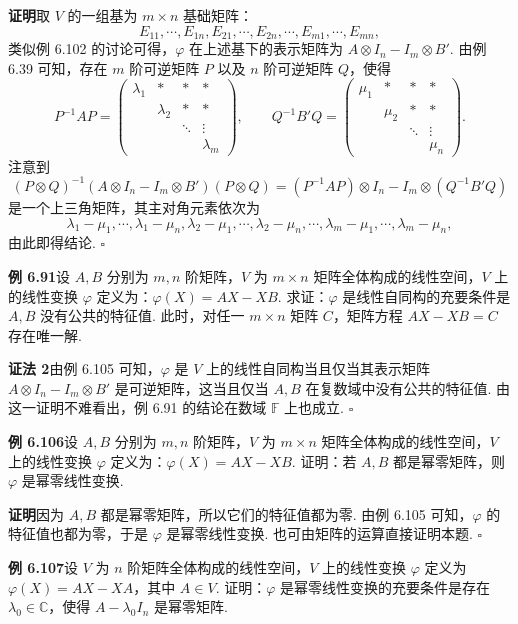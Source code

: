 \documentclass[UTF8,12pt,a4paper,fontset=fandol]{ctexart}
\begin{document}
\noindent\textbf{证明}\quad 取 $V$ 的一组基为 $m\times n$ 基础矩阵：
\[
E_{11},\cdots,E_{1n},E_{21},\cdots,E_{2n},\cdots,E_{m1},\cdots,E_{mn},
\]
类似例 6.102 的讨论可得，$\varphi$ 在上述基下的表示矩阵为 $A\otimes I_n-I_m\otimes B'$. 由例 6.39 可知，存在 $m$ 阶可逆矩阵 $P$ 以及 $n$ 阶可逆矩阵 $Q$，使得
\[
P^{-1}AP=
\begin{pmatrix}
\lambda_1&*&*&*\\
&\lambda_2&*&*\\
&&\ddots&\vdots\\
&&&\lambda_m
\end{pmatrix},\qquad
Q^{-1}B'Q=
\begin{pmatrix}
\mu_1&*&*&*\\
&\mu_2&*&*\\
&&\ddots&\vdots\\
&&&\mu_n
\end{pmatrix}.
\]
注意到
\[
(P\otimes Q)^{-1}(A\otimes I_n-I_m\otimes B')(P\otimes Q)=(P^{-1}AP)\otimes I_n-I_m\otimes(Q^{-1}B'Q)
\]
是一个上三角矩阵，其主对角元素依次为
\[
\lambda_1-\mu_1,\cdots,\lambda_1-\mu_n,\lambda_2-\mu_1,\cdots,\lambda_2-\mu_n,\cdots,\lambda_m-\mu_1,\cdots,\lambda_m-\mu_n,
\]
由此即得结论. $\square$

\noindent\textbf{例 6.91}\quad 设 $A,B$ 分别为 $m,n$ 阶矩阵，$V$ 为 $m\times n$ 矩阵全体构成的线性空间，$V$ 上的线性变换 $\varphi$ 定义为：$\varphi(X)=AX-XB$. 求证：$\varphi$ 是线性自同构的充要条件是 $A,B$ 没有公共的特征值. 此时，对任一 $m\times n$ 矩阵 $C$，矩阵方程 $AX-XB=C$ 存在唯一解.

\noindent\textbf{证法 2}\quad 由例 6.105 可知，$\varphi$ 是 $V$ 上的线性自同构当且仅当其表示矩阵 $A\otimes I_n-I_m\otimes B'$ 是可逆矩阵，这当且仅当 $A,B$ 在复数域中没有公共的特征值. 由这一证明不难看出，例 6.91 的结论在数域 $\mathbb{F}$ 上也成立. $\square$

\noindent\textbf{例 6.106}\quad 设 $A,B$ 分别为 $m,n$ 阶矩阵，$V$ 为 $m\times n$ 矩阵全体构成的线性空间，$V$ 上的线性变换 $\varphi$ 定义为：$\varphi(X)=AX-XB$. 证明：若 $A,B$ 都是幂零矩阵，则 $\varphi$ 是幂零线性变换.

\noindent\textbf{证明}\quad 因为 $A,B$ 都是幂零矩阵，所以它们的特征值都为零. 由例 6.105 可知，$\varphi$ 的特征值也都为零，于是 $\varphi$ 是幂零线性变换. 也可由矩阵的运算直接证明本题. $\square$

\noindent\textbf{例 6.107}\quad 设 $V$ 为 $n$ 阶矩阵全体构成的线性空间，$V$ 上的线性变换 $\varphi$ 定义为 $\varphi(X)=AX-XA$，其中 $A\in V$. 证明：$\varphi$ 是幂零线性变换的充要条件是存在 $\lambda_0\in\mathbb{C}$，使得 $A-\lambda_0I_n$ 是幂零矩阵.
\end{document}

